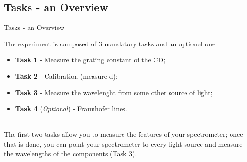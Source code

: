 \documentclass[9pt, xcolor=dvipsnames]{beamer}
\begin{document}
\subsection{ Tasks - an Overview}
\begin{frame}{Tasks - an Overview}

The experiment is composed of 3 mandatory tasks and an optional one. 
\begin{itemize}
	\item \textbf{Task 1} - Measure the grating constant of the CD;
	\item \textbf{Task 2} - Calibration (measure d);
	\item \textbf{Task 3} - Measure the wavelenght from some other source of light;
	\item \textbf{Task 4} (\textit{Optional}) - Fraunhofer lines.
	\end{itemize}
	
	~\\
	The first two tasks allow you to measure the features of your spectrometer; once that is done, you can point your spectrometer to every light source and measure the wavelengths of the components (Task 3).

\end{frame}
\end{document}
